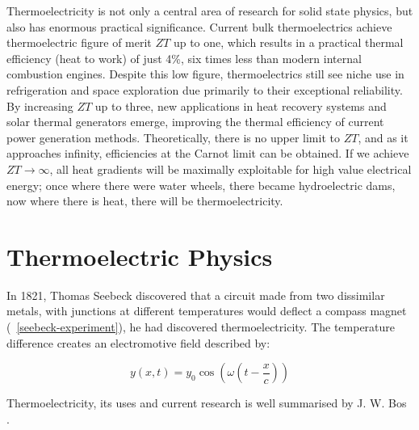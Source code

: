 \documentclass[a4paper,10pt,journal]{IEEEtran}
\newcommand{\figref}[2][\figurename~]{#1\ref{#2}}
\begin{document}
Thermoelectricity is not only a central area of research for solid
state physics, but also has enormous practical significance. Current
bulk thermoelectrics achieve thermoelectric figure of merit $ZT$ up to
one, which results in a practical thermal efficiency (heat to work) of
just 4\%, six times less than modern internal combustion engines.
Despite this low figure, thermoelectrics still see niche use
in refrigeration and space exploration due primarily to their
exceptional reliability. By increasing $ZT$ up to three, new
applications in heat recovery systems and solar thermal generators
emerge, improving the thermal efficiency of current power generation
methods. Theoretically, there is no upper limit to $ZT$, and as it
approaches infinity, efficiencies at the Carnot limit can be obtained.
If we achieve $ZT \to\infty$, all heat gradients will be maximally
exploitable for high value electrical energy; once where there were
water wheels, there became hydroelectric dams, now where there is
heat, there will be thermoelectricity.

\section{Thermoelectric Physics}
In 1821, Thomas Seebeck discovered that a circuit made from two
dissimilar metals, with junctions at different temperatures would
deflect a compass magnet (\figref{seebeck-experiment}), he had
discovered thermoelectricity. The temperature difference creates an
electromotive field described by:

\begin{equation}
\label{seebeck-emf}
	y(x,t) = y_0 \cos(\omega(t-\frac{x}{c}))
\end{equation}


Thermoelectricity, its uses and current research is well summarised by
J. W. Bos \cite{rsc-eic}.

\end{document}
